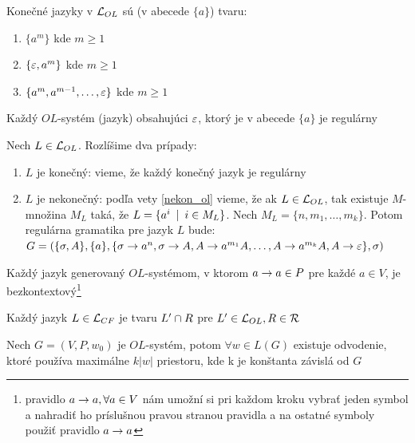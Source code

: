 \begin{poznamka}
  Konečné jazyky v $\mathcal{L}_{OL}$ sú (v abecede $\{a\}$) tvaru:
  \begin{enumerate}
    \item $\{a^{m}\}$ kde $m\geq1$
    \item $\{\varepsilon,a^{m}\}$ kde $m\geq1$
    \item $\{a^{m},a^{m-1},\dots,\varepsilon\}$ kde $m\geq1$
  \end{enumerate}
\end{poznamka}

\begin{veta}
  Každý $OL$-systém (jazyk) obsahujúci $\varepsilon$, ktorý je v
  abecede $\{a\}$ je regulárny
\end{veta}

\begin{dokaz}
  Nech $L\in\mathcal{L}_{OL}$. Rozlíšime dva prípady:
  \begin{enumerate}
    \item $L$ je konečný: vieme, že každý konečný jazyk je regulárny
    \item $L$ je nekonečný: podľa vety \ref{nekon_ol} vieme, že ak
        $L\in\mathcal{L}_{OL}$, tak existuje $M$-množina $M_L$ taká, že
        $L=\{a^i\enspace |\enspace i\in M_L\}$. Nech $M_L=\{n,m_1,\dots,m_k\}$. Potom
        regulárna gramatika pre jazyk $L$ bude:
        $G=(\{\sigma,A\},\{a\},\{\sigma\rightarrow a^n,\sigma\rightarrow A,A\rightarrow
        a^{m_1}A,\dots,A\rightarrow a^{m_k}A,A\rightarrow \varepsilon\},\sigma)$
  \end{enumerate}
\end{dokaz}

\begin{poznamka}
  Každý jazyk generovaný $OL$-systémom, v ktorom $a\rightarrow a\in P$ pre
  každé $a\in V$, je bezkontextový\footnote{pravidlo $a\rightarrow a,\forall
  a\in V$ nám umožní si pri každom kroku vybrať jeden symbol a
  nahradiť ho príslušnou pravou stranou pravidla a na ostatné
  symboly použiť pravidlo $a\rightarrow a$}
\end{poznamka}

\begin{poznamka}
  Každý jazyk $L\in\mathcal{L}_{CF}$ je tvaru $L'\cap R$ pre
  $L'\in\mathcal{L}_{OL},R\in\mathcal{R}$
\end{poznamka}

\begin{lema}
  \label{linear} Nech $G=(V,P,w_0)$ je $OL$-systém, potom $\forall
  w\in L(G)$ existuje odvodenie, ktoré používa ma\-xi\-mál\-ne
  $k|w|$ priestoru, kde k je konštanta závislá od $G$
\end{lema}

